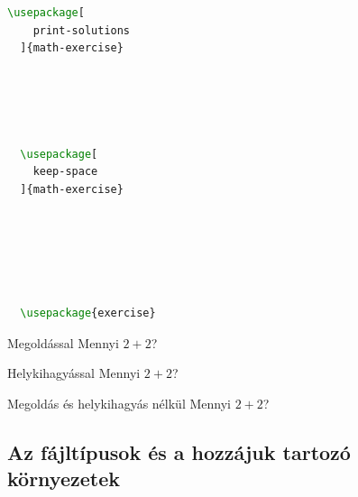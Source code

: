 \begin{minipage}[t]{.33\textwidth}
	\begin{lstlisting}[language=tex,caption={Csomag használata}]
  \usepackage[
    print-solutions
  ]{math-exercise}





  \usepackage[
    keep-space
  ]{math-exercise}






  \usepackage{exercise}


  \end{lstlisting}
\end{minipage}\hfill
\begin{minipage}[t]{.63\textwidth}
	\begin{exercise}{Megoldással}
		Mennyi $2+2$?

		\exsol{%
			\vspace{-8mm}
			\[
				2 + 2 = 4
			\]
			\vspace{-10mm}
		}
	\end{exercise}
	\vspace{-1.5mm}

	\makeatletter
	\print@@solsfalse
	\keep@@spacetrue
	\begin{exercise}{Helykihagyással}
		Mennyi $2+2$?

		\exsol[11mm]{}
	\end{exercise}
	\vspace{-1.5mm}

	\keep@@spacefalse
	\begin{exercise}{Megoldás és helykihagyás nélkül}
		Mennyi $2+2$?
	\end{exercise}
	\makeatother
\end{minipage}



\subsection{Az fájltípusok és a hozzájuk tartozó környezetek}
